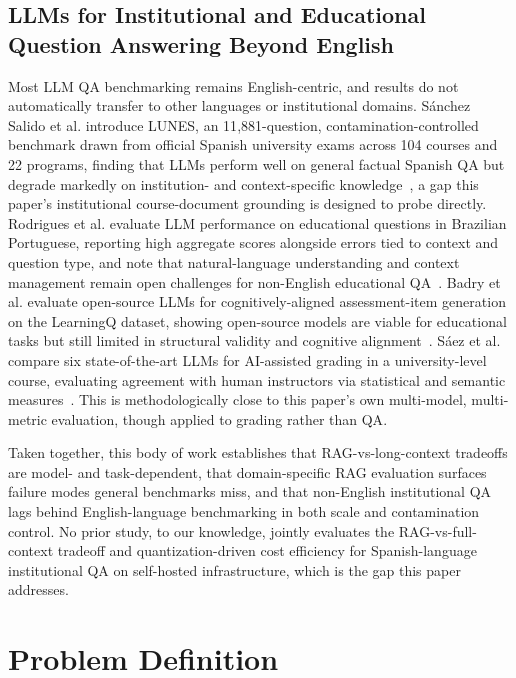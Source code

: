 \documentclass[conference]{IEEEtran}
\begin{document}
\subsection{LLMs for Institutional and Educational Question Answering Beyond English}

Most \gls{LLM} \gls{QA} benchmarking remains English-centric, and results do not automatically transfer to other languages or institutional domains.
S\'anchez Salido et al. introduce LUNES, an 11{,}881-question, contamination-controlled benchmark drawn from official Spanish university exams across 104 courses and 22 programs, finding that LLMs perform well on general factual Spanish QA but degrade markedly on institution- and context-specific knowledge~\cite{sanchezsalido2026lunes}, a gap this paper's institutional course-document grounding is designed to probe directly.
Rodrigues et al. evaluate \gls{LLM} performance on educational questions in Brazilian Portuguese, reporting high aggregate scores alongside errors tied to context and question type, and note that natural-language understanding and context management remain open challenges for non-English educational \gls{QA}~\cite{rodrigues2025brazilianqa}.
Badry et al. evaluate open-source LLMs for cognitively-aligned assessment-item generation on the LearningQ dataset, showing open-source models are viable for educational tasks but still limited in structural validity and cognitive alignment~\cite{badry2026learningq}.
S\'aez et al. compare six state-of-the-art LLMs for AI-assisted grading in a university-level course, evaluating agreement with human instructors via statistical and semantic measures~\cite{saez2026aigrading}. This is methodologically close to this paper's own multi-model, multi-metric evaluation, though applied to grading rather than \gls{QA}.

Taken together, this body of work establishes that RAG-vs-long-context tradeoffs are model- and task-dependent, that domain-specific RAG evaluation surfaces failure modes general benchmarks miss, and that non-English institutional \gls{QA} lags behind English-language benchmarking in both scale and contamination control.
No prior study, to our knowledge, jointly evaluates the RAG-vs-full-context tradeoff and quantization-driven cost efficiency for Spanish-language institutional \gls{QA} on self-hosted infrastructure, which is the gap this paper addresses.

\section{Problem Definition}
\end{document}
